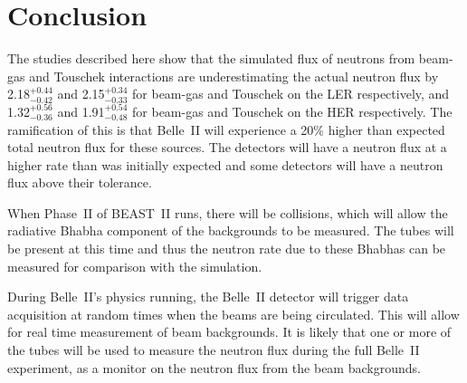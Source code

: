 \chapter{Conclusion}
\label{chap:Concl}



The studies described here show that the simulated flux of neutrons from beam-gas and Touschek interactions are underestimating the actual neutron flux by 2.18$^{+0.44}_{-0.42}$ and 2.15$^{+0.34}_{-0.33}$ for beam-gas and Touschek on the LER respectively, and 1.32$^{+0.56}_{-0.36}$ and 1.91$^{+0.54}_{-0.48}$ for beam-gas and Touschek on the HER respectively. The ramification of this is that Belle~II will experience a 20\% higher than expected total neutron flux for these sources. The detectors will have a neutron flux at a higher rate than was initially expected and some detectors will have a neutron flux above their tolerance.

When Phase~II of BEAST~II runs, there will be collisions, which will allow the radiative Bhabha component of the backgrounds to be measured. The \he tubes will be present at this time and thus the neutron rate due to these Bhabhas can be measured for comparison with the simulation.

During Belle~II's physics running, the Belle~II detector will trigger data acquisition at random times when the beams are being circulated. This will allow for real time measurement of beam backgrounds. It is likely that one or more of the \he tubes will be used to measure the neutron flux during the full Belle~II experiment, as a monitor on the neutron flux from the beam backgrounds.






